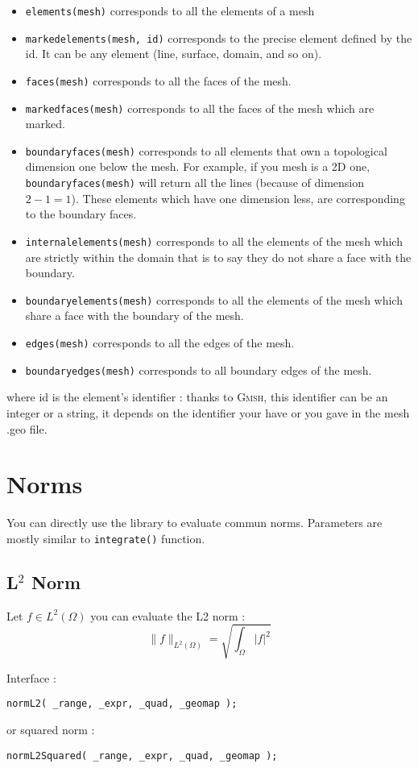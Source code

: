 \begin{itemize}
\item \lstinline!elements(mesh)!  corresponds to all the elements of a mesh
\item \lstinline!markedelements(mesh, id)!  corresponds to the precise element defined by the id. It can be any element (line, surface, domain, and so on).
\item \lstinline!faces(mesh)!  corresponds to all the faces of the mesh.
\item \lstinline!markedfaces(mesh)!  corresponds to all the faces of the mesh which are marked.
\item \lstinline!boundaryfaces(mesh)!  corresponds to all elements that own a topological dimension one below the mesh. For example, if you mesh is a 2D one, \lstinline!boundaryfaces(mesh)! will return all the lines (because of dimension $2-1=1$). These elements which have one dimension less, are corresponding to the boundary faces.
\item \lstinline!internalelements(mesh)!  corresponds to all the elements of the mesh which are strictly within the domain that is to say they do not share a face with the boundary.
\item \lstinline!boundaryelements(mesh)!  corresponds to all the elements of the mesh which share a face with the boundary of the mesh.
\item \lstinline!edges(mesh)!  corresponds to all the edges of the mesh.
\item \lstinline!boundaryedges(mesh)!  corresponds to all boundary edges of the mesh.
\end{itemize}
where id is the element's identifier : thanks to \textsc{Gmsh}, this identifier can be an integer or a string, it depends on the identifier your have or you gave in the mesh .geo file.

\section{Norms}
You can directly use the library to evaluate commun norms. Parameters are mostly similar to \lstinline!integrate()! function.

\subsection{L$^2$ Norm}
Let $f \in L^2(\Omega)$ you can evaluate the L2 norm :
$$\parallel f\parallel_{L^2(\Omega)}=\sqrt{\int_\Omega |f|^2}$$

\label{keywords:normL2}
\noindent Interface :
\begin{lstlisting}
normL2( _range, _expr, _quad, _geomap );
\end{lstlisting}
or squared norm :
\begin{lstlisting}
normL2Squared( _range, _expr, _quad, _geomap );
\end{lstlisting}

